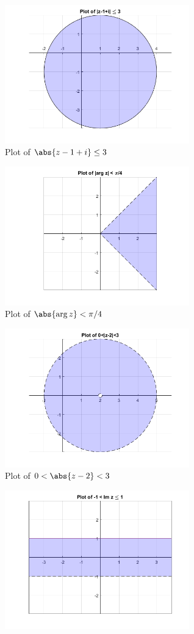 \documentclass{article}
\begin{document}
\begin{itemize}
		\begin{figure}[h]
			\begin{subfigure}{0.5\textwidth}
				\includegraphics[width=8cm]{2a}
				\caption{Plot of $\abs{z-1+i}\le 3$}
			\end{subfigure}
			\begin{subfigure}{0.5\textwidth}
				\includegraphics[width=8cm]{2b}
				\caption{Plot of $\abs{\arg z}<\pi/4$}
			\end{subfigure}
			\begin{subfigure}{0.5\textwidth}
				\includegraphics[width=8cm]{2c}
				\caption{Plot of $0<\abs{z-2}<3$}
			\end{subfigure}
			\begin{subfigure}{0.5\textwidth}
				\includegraphics[width=8cm]{2d}

\end{subfigure}
\end{figure}
\end{itemize}
\end{document}
